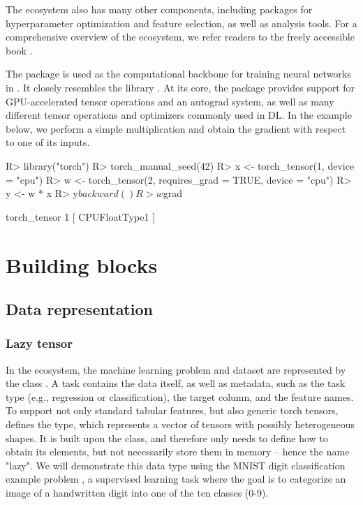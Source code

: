 \documentclass[article]{jss}
\theoremstyle{definition}
\begin{document}
The  ecosystem also has many other components, including packages for hyperparameter optimization and feature selection, as well as analysis tools.
For a comprehensive overview of the  ecosystem, we refer readers to the freely accessible book \citep{ref-mlr3book}.

The  package is used as the computational backbone for training neural networks in .
It closely resembles the \pytorch{} \python{} library \citep{ref-pytorch}.
At its core, the package provides support for GPU-accelerated tensor operations and an autograd system, as well as many different tensor operations and optimizers commonly used in DL.
In the example below, we perform a simple multiplication and obtain the gradient with respect to one of its inputs.

\begin{CodeInput}
R> library("torch")
R> torch_manual_seed(42)
R> x <- torch_tensor(1, device = "cpu")
R> w <- torch_tensor(2, requires_grad = TRUE, device = "cpu")
R> y <- w * x
R> y$backward()
R> w$grad
\end{CodeInput}
\begin{CodeOutput}
torch_tensor
 1
[ CPUFloatType{1} ]
\end{CodeOutput}

\section{Building blocks}\label{sec:building-blocks}

\subsection{Data representation}

\subsubsection{Lazy tensor}

In the  ecosystem, the machine learning problem and dataset are represented by the  class .
A task contains the data itself, as well as metadata, such as the task type (e.g., regression or classification), the target column, and the feature names.
To support not only standard tabular features, but also generic torch tensors,  defines the  type, which represents a vector of tensors with possibly heterogeneous shapes.
It is built upon the  class, and therefore only needs to define how to obtain its elements, but not necessarily store them in memory -- hence the name "lazy".
We will demonstrate this data type using the MNIST digit classification example problem \citep{ref-mnist-2012}, a supervised learning task where the goal is to categorize an image of a handwritten digit into one of the ten classes (0-9).
\end{document}
